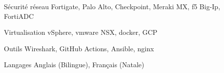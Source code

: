 

\begin{cvskills}

  \cvskill
    {Sécurité réseau} %
    {Fortigate, Palo Alto, Checkpoint, Meraki MX, f5 Big-Ip, FortiADC} %

  \cvskill
    {Virtualisation} %
    {vSphere, vmware NSX, docker, GCP} %

  \cvskill
    {Outils} %
    {Wireshark, GitHub Actions, Ansible, nginx} %


  \cvskill
    {Langages} %
    {Anglais (Bilingue), Français (Natale)} %

\end{cvskills}
